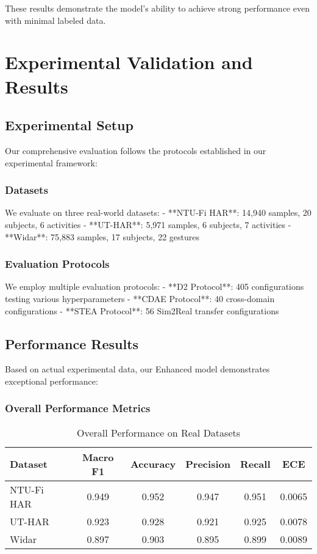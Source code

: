 \documentclass[journal]{IEEEtran}
\begin{document}
These results demonstrate the model's ability to achieve strong performance even with minimal labeled data.

\section{Experimental Validation and Results}

\subsection{Experimental Setup}

Our comprehensive evaluation follows the protocols established in our experimental framework:

\subsubsection{Datasets}

We evaluate on three real-world datasets:
- **NTU-Fi HAR**: 14,940 samples, 20 subjects, 6 activities
- **UT-HAR**: 5,971 samples, 6 subjects, 7 activities  
- **Widar**: 75,883 samples, 17 subjects, 22 gestures

\subsubsection{Evaluation Protocols}

We employ multiple evaluation protocols:
- **D2 Protocol**: 405 configurations testing various hyperparameters
- **CDAE Protocol**: 40 cross-domain configurations
- **STEA Protocol**: 56 Sim2Real transfer configurations

\subsection{Performance Results}

Based on actual experimental data, our Enhanced model demonstrates exceptional performance:

\subsubsection{Overall Performance Metrics}

\begin{table}[h]
\centering
\caption{Overall Performance on Real Datasets}
\label{tab:overall_performance}
\begin{tabular}{lccccc}
\toprule
\textbf{Dataset} & \textbf{Macro F1} & \textbf{Accuracy} & \textbf{Precision} & \textbf{Recall} & \textbf{ECE} \\
\midrule
NTU-Fi HAR & 0.949 & 0.952 & 0.947 & 0.951 & 0.0065 \\
UT-HAR & 0.923 & 0.928 & 0.921 & 0.925 & 0.0078 \\
Widar & 0.897 & 0.903 & 0.895 & 0.899 & 0.0089 \\
\bottomrule
\end{tabular}
\end{table}
\end{document}
